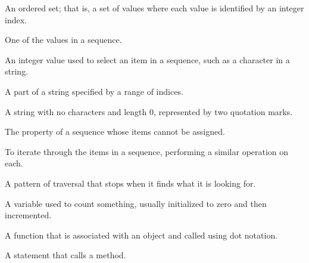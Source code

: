 \begin{vocabulary}[sequence:] An ordered set; that is, a set of
values where each value is identified by an integer index.
\end{vocabulary}
	
\begin{vocabulary}[item:] One of the values in a sequence.
\end{vocabulary}
	
\begin{vocabulary}[index:] An integer value used to select an item in
a sequence, such as a character in a string.
\end{vocabulary}
	
\begin{vocabulary}[slice:] A part of a string specified by a range of indices.
\end{vocabulary}
	
\begin{vocabulary} A string with no characters and length 0, represented
by two quotation marks.
\end{vocabulary}
	
\begin{vocabulary}[immutable:] The property of a sequence whose items cannot
be assigned.
\end{vocabulary}
	
\begin{vocabulary}[traverse:] To iterate through the items in a sequence,
performing a similar operation on each.
\end{vocabulary}
	
\begin{vocabulary}[search:] A pattern of traversal that stops
when it finds what it is looking for.
\end{vocabulary}
	
\begin{vocabulary}[counter:] A variable used to count something, usually initialized
to zero and then incremented.
\end{vocabulary}
	
\begin{vocabulary}[method:] A function that is associated with an object and called
using dot notation.
\end{vocabulary}
	
\begin{vocabulary}[invocation:] A statement that calls a method.
\end{vocabulary}
	


